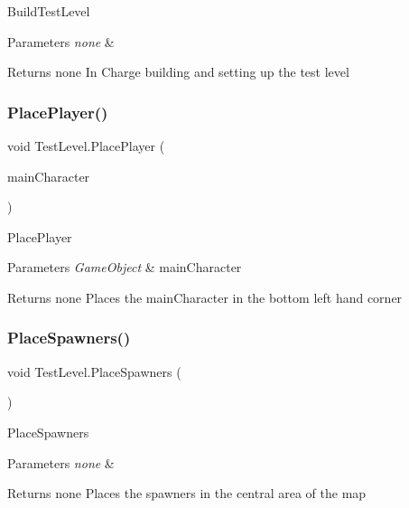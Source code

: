 Build\+Test\+Level 
\begin{DoxyParams}{Parameters}
{\em none} & \\
\hline
\end{DoxyParams}
\begin{DoxyReturn}{Returns}
none In Charge building and setting up the test level 
\end{DoxyReturn}
\mbox{\label{class_test_level_a7d2ab938df8d29835dee0e7c0defb8e0}} 
\subsubsection{\texorpdfstring{Place\+Player()}{PlacePlayer()}}
{\footnotesize\ttfamily void Test\+Level.\+Place\+Player (\begin{DoxyParamCaption}\item[{Game\+Object}]{main\+Character }\end{DoxyParamCaption})\hspace{0.3cm}{\ttfamily [inline]}}

Place\+Player 
\begin{DoxyParams}{Parameters}
{\em Game\+Object} & main\+Character \\
\hline
\end{DoxyParams}
\begin{DoxyReturn}{Returns}
none Places the main\+Character in the bottom left hand corner 
\end{DoxyReturn}
\mbox{\label{class_test_level_a364cafbd3aa2773d6bba94c313eb0b21}} 
\subsubsection{\texorpdfstring{Place\+Spawners()}{PlaceSpawners()}}
{\footnotesize\ttfamily void Test\+Level.\+Place\+Spawners (\begin{DoxyParamCaption}{ }\end{DoxyParamCaption})\hspace{0.3cm}{\ttfamily [inline]}}

Place\+Spawners 
\begin{DoxyParams}{Parameters}
{\em none} & \\
\hline
\end{DoxyParams}
\begin{DoxyReturn}{Returns}
none Places the spawners in the central area of the map 
\end{DoxyReturn}
\mbox{\label{class_test_level_aaad14a792f3c43f6fb9cb012b1dec89d}} 
